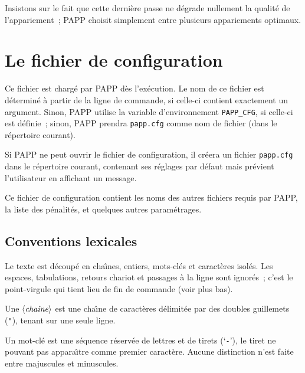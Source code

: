 \documentclass[10pt]{article}
\def\tthdump#1{#1}
\begin{document}
Insistons sur le fait que cette derni\`ere passe ne d\'egrade 
nullement la qualit\'e de l'appa\-rie\-ment~; PAPP choisit simplement entre plusieurs 
appariements optimaux.

\section{Le fichier de configuration}

%
\def\gram#1{$\langle\hbox{\it#1}\rangle$}  
\def\opt#1{$[\hbox{\it#1}]$}     %
\def\optr#1{$\lbrace\hbox{\it#1}\rbrace$}
\def\fleche{$  \longrightarrow\,\,\,  $}
\def\ou{$\vert\,\tthdump{\,}$}
\def\vrb#1{{\tt #1}}	%

	Ce fichier est charg\'e par PAPP d\`es l'ex\'ecution.  Le nom
de ce fichier est d\'etermin\'e \`a partir de la ligne de commande, si
celle-ci contient exactement un argument.  Sinon, PAPP utilise la
variable d'environnement \verb|PAPP_CFG|, si celle-ci est d\'efinie~;
sinon, PAPP prendra \verb|papp.cfg| comme nom de fichier (dans le
r\'epertoire courant).

	Si PAPP ne peut ouvrir le fichier de configuration, il
cr\'eera un fichier \verb|papp.cfg| dans le r\'epertoire courant,
contenant ses r\'eglages par d\'efaut mais pr\'evient l'utilisateur
en affichant un message.
 
	Ce fichier de configuration contient les noms des autres
fichiers requis par PAPP, la liste des p\'enalit\'es, et quelques
autres param\'etrages.
 
\subsection{Conventions lexicales}

	Le texte est d\'ecoup\'e en cha{\^\i}nes, entiers, mots-cl\'es
et caract\`eres isol\'es.  Les espaces, tabulations, retours chariot
et passages \`a la ligne sont ignor\'es~; c'est le point-virgule qui
tient lieu de fin de commande (voir plus bas).

	Une \gram{chaine} est une cha{\^\i}ne de caract\`eres
d\'elimit\'ee par des doubles guillemets (\verb|"|), tenant sur une
seule ligne.

	Un mot-cl\'e est une s\'equence r\'eserv\'ee de lettres et de
tirets (`\verb|-|'), le tiret ne pouvant pas appara{\^\i}tre comme
premier caract\`ere.  Aucune distinction n'est faite entre majuscules
et minuscules.
\end{document}
